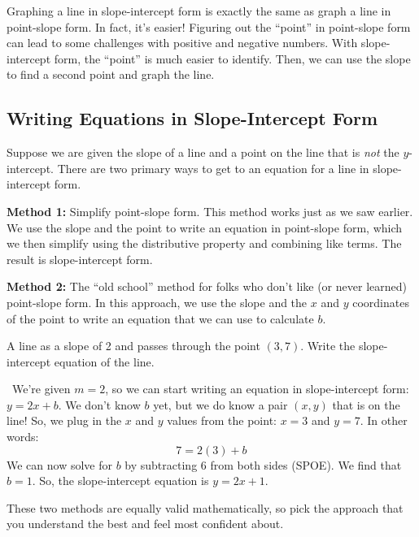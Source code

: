 Graphing a line in slope-intercept form is exactly the same as graph a line in point-slope form. In fact, it's easier! Figuring out the ``point'' in point-slope form can lead to some challenges with positive and negative numbers. With slope-intercept form, the ``point'' is much easier to identify. Then, we can use the slope to find a second point and graph the line.

\subsection{Writing Equations in Slope-Intercept Form}

Suppose we are given the slope of a line and a point on the line that is \textit{not} the $y$-intercept. There are two primary ways to get to an equation for a line in slope-intercept form.

\textbf{Method 1:} Simplify point-slope form. This method works just as we saw earlier. We use the slope and the point to write an equation in point-slope form, which we then simplify using the distributive property and combining like terms. The result is slope-intercept form.

\textbf{Method 2:} The ``old school'' method for folks who don't like (or never learned) point-slope form. In this approach, we use the slope and the $x$ and $y$ coordinates of the point to write an equation that we can use to calculate $b$.

\begin{boxedex}
A line as a slope of 2 and passes through the point $(3, 7)$. Write the slope-intercept equation of the line.

\exsoln\ We're given $m=2$, so we can start writing an equation in slope-intercept form: $y=2x+b$. We don't know $b$ yet, but we do know a pair $(x,y)$ that is on the line! So, we plug in the $x$ and $y$ values from the point: $x=3$ and $y=7$. In other words: \[7=2(3) + b\]
We can now solve for $b$ by subtracting 6 from both sides (SPOE). We find that $b=1$. So, the slope-intercept equation is $y = 2x + 1$.
\end{boxedex}

These two methods are equally valid mathematically, so pick the approach that you understand the best and feel most confident about.

